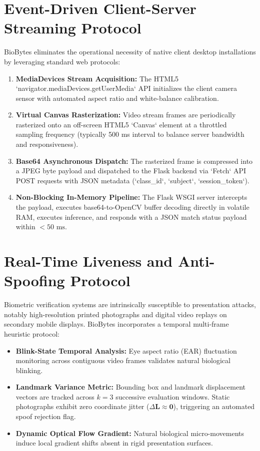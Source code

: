 \section{Event-Driven Client-Server Streaming Protocol}
BioBytes eliminates the operational necessity of native client desktop installations by leveraging standard web protocols:
\begin{enumerate}
    \item \textbf{MediaDevices Stream Acquisition:} The HTML5 `navigator.mediaDevices.getUserMedia` API initializes the client camera sensor with automated aspect ratio and white-balance calibration.
    \item \textbf{Virtual Canvas Rasterization:} Video stream frames are periodically rasterized onto an off-screen HTML5 `Canvas` element at a throttled sampling frequency (typically 500 ms interval to balance server bandwidth and responsiveness).
    \item \textbf{Base64 Asynchronous Dispatch:} The rasterized frame is compressed into a JPEG byte payload and dispatched to the Flask backend via `Fetch` API POST requests with JSON metadata (`class_id`, `subject`, `session_token`).
    \item \textbf{Non-Blocking In-Memory Pipeline:} The Flask WSGI server intercepts the payload, executes base64-to-OpenCV buffer decoding directly in volatile RAM, executes inference, and responds with a JSON match status payload within $< 50\text{ ms}$.
\end{enumerate}

\section{Real-Time Liveness and Anti-Spoofing Protocol}
Biometric verification systems are intrinsically susceptible to presentation attacks, notably high-resolution printed photographs and digital video replays on secondary mobile displays. BioBytes incorporates a temporal multi-frame heuristic protocol:
\begin{itemize}
    \item \textbf{Blink-State Temporal Analysis:} Eye aspect ratio (EAR) fluctuation monitoring across contiguous video frames validates natural biological blinking.
    \item \textbf{Landmark Variance Metric:} Bounding box and landmark displacement vectors are tracked across $k=3$ successive evaluation windows. Static photographs exhibit zero coordinate jitter ($\Delta \mathbf{L} \approx \mathbf{0}$), triggering an automated spoof rejection flag.
    \item \textbf{Dynamic Optical Flow Gradient:} Natural biological micro-movements induce local gradient shifts absent in rigid presentation surfaces.
\end{itemize}
